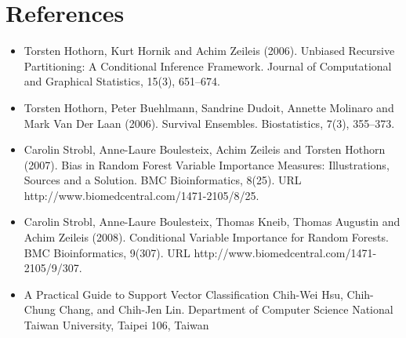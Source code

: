 \section{References}
\vspace{-0.1in}
 
\begin{itemize}
\item Torsten Hothorn, Kurt Hornik and Achim Zeileis (2006). Unbiased Recursive Partitioning: A Conditional Inference Framework. Journal of Computational and Graphical Statistics, 15(3), 651--674.

\item Torsten Hothorn, Peter Buehlmann, Sandrine Dudoit, Annette Molinaro and Mark Van Der Laan (2006). Survival Ensembles. Biostatistics, 7(3), 355--373.

\item Carolin Strobl, Anne-Laure Boulesteix, Achim Zeileis and Torsten Hothorn (2007). Bias in Random Forest Variable Importance Measures: Illustrations, Sources and a Solution. BMC Bioinformatics, 8(25). URL http://www.biomedcentral.com/1471-2105/8/25.

\item Carolin Strobl, Anne-Laure Boulesteix, Thomas Kneib, Thomas Augustin and Achim Zeileis (2008). Conditional Variable Importance for Random Forests. BMC Bioinformatics, 9(307). URL http://www.biomedcentral.com/1471-2105/9/307.

\item A Practical Guide to Support Vector Classification Chih-Wei Hsu, Chih-Chung Chang, and Chih-Jen Lin. Department of Computer Science National Taiwan University, Taipei 106, Taiwan
\end{itemize}
